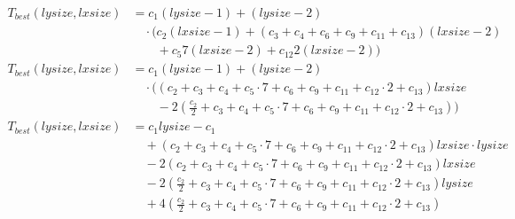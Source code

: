 \begin{subequations}
\label{eq:analyse-arlabeling-regionlabeling-1}
\begin{align}
\label{eq:analyse-arlabeling-regionlabeling-1-1}
T_{best}(\mathit{lysize},\mathit{lxsize})& = c_{1}(\mathit{lysize} - 1) + (\mathit{lysize} - 2) \\
& \quad \cdot \bigl(c_2(\mathit{lxsize} - 1) + (c_{3} + c_{4} + c_{6} + c_{9} + c_{11} + c_{13})(\mathit{lxsize} - 2)
 \nonumber \\
& \quad \quad + c_{5}7(\mathit{lxsize} - 2) + c_{12}2(\mathit{lxsize} - 2) \bigr) \nonumber \\
\label{eq:analyse-arlabeling-regionlabeling-1-2}
T_{best}(\mathit{lysize},\mathit{lxsize})& = c_{1}(\mathit{lysize} - 1) + (\mathit{lysize} - 2) \\
& \quad \cdot \bigl((c_{2} + c_{3} + c_{4} + c_{5} \cdot 7 + c_{6} + c_{9} + c_{11} + c_{12} \cdot 2 + c_{13})\mathit{lxsize}
 \nonumber \\
& \quad \quad - 2(\frac{c_2}{2} + c_{3} + c_{4} + c_{5} \cdot 7 + c_{6} + c_{9} + c_{11} + c_{12} \cdot 2 + c_{13})\bigr)
 \nonumber \\
\label{eq:analyse-arlabeling-regionlabeling-1-3}
T_{best}(\mathit{lysize},\mathit{lxsize})& = c_{1}\mathit{lysize} - c_{1}
 \\
& \quad + (c_{2} + c_{3} + c_{4} + c_{5} \cdot 7 + c_{6} + c_{9} + c_{11} + c_{12} \cdot 2 + c_{13})\mathit{lxsize}\cdot\mathit{lysize}
 \nonumber \\
& \quad - 2(c_{2} + c_{3} + c_{4} + c_{5} \cdot 7 + c_{6} + c_{9} + c_{11} + c_{12} \cdot 2 + c_{13})\mathit{lxsize}
 \nonumber \\
& \quad - 2(\frac{c_2}{2} + c_{3} + c_{4} + c_{5} \cdot 7 + c_{6} + c_{9} + c_{11} + c_{12} \cdot 2 + c_{13})\mathit{lysize}
 \nonumber \\
& \quad + 4(\frac{c_2}{2} + c_{3} + c_{4} + c_{5} \cdot 7 + c_{6} + c_{9} + c_{11} + c_{12} \cdot 2 + c_{13})
 \nonumber
\end{align}
\end{subequations}
